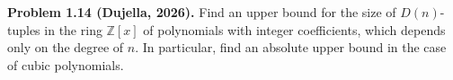\textbf{Problem 1.14 (Dujella, 2026).} Find an upper bound for the size of $D(n)$-tuples in the ring $\mathbb{Z}[x]$ of polynomials with integer coefficients, which depends only on the degree of $n$. In particular, find an absolute upper bound in the case of cubic polynomials.
